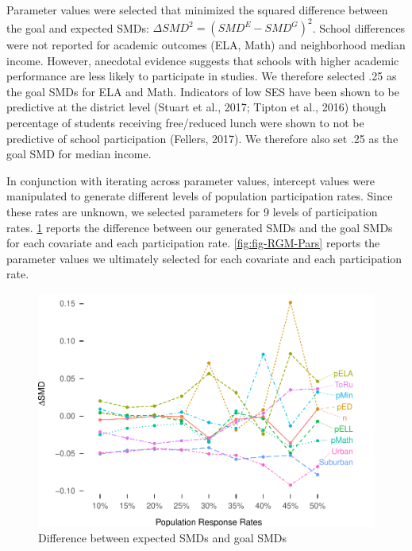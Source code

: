 \documentclass[man,floatsintext]{apa6}
\theoremstyle{definition}
\theoremstyle{definition}
\theoremstyle{definition}
\theoremstyle{remark}
\begin{document}
Parameter values were selected that minimized the squared difference
between the goal and expected SMDs: \(\Delta SMD^2 = (SMD^E-SMD^G)^2\).
School differences were not reported for academic outcomes (ELA, Math)
and neighborhood median income. However, anecdotal evidence suggests
that schools with higher academic performance are less likely to
participate in studies. We therefore selected .25 as the goal SMDs for
ELA and Math. Indicators of low SES have been shown to be predictive at
the district level (Stuart et al., 2017; Tipton et al., 2016) though
percentage of students receiving free/reduced lunch were shown to not be
predictive of school participation (Fellers, 2017). We therefore also
set .25 as the goal SMD for median income.

In conjunction with iterating across parameter values, intercept values
were manipulated to generate different levels of population
participation rates. Since these rates are unknown, we selected
parameters for 9 levels of participation rates. \ref{fig:fig-SMD-goal}
reports the difference between our generated SMDs and the goal SMDs for
each covariate and each participation rate. \ref{fig:fig-RGM-Pars}
reports the parameter values we ultimately selected for each covariate
and each participation rate.

\begin{figure}
\centering
\includegraphics{GenSamp_Paper_files/figure-latex/fig-SMD-goal-1.pdf}
\caption{\label{fig:fig-SMD-goal}Difference between expected SMDs and goal
SMDs}
\end{figure}
\end{document}
